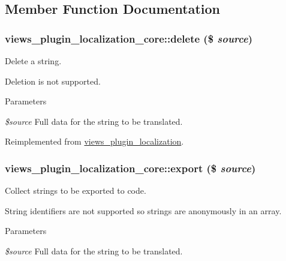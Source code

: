 \subsection{Member Function Documentation}
\hypertarget{classviews__plugin__localization__core_a9d1aef13f48d44133c19dcde49c9e123}{
\subsubsection[{delete}]{\setlength{\rightskip}{0pt plus 5cm}views\_\-plugin\_\-localization\_\-core::delete (\$ {\em source})}}
\label{classviews__plugin__localization__core_a9d1aef13f48d44133c19dcde49c9e123}
Delete a string.

Deletion is not supported.


\begin{DoxyParams}{Parameters}
\item[{\em \$source}]Full data for the string to be translated. \end{DoxyParams}


Reimplemented from \hyperlink{classviews__plugin__localization_a52726c9177d4dcf033ac81c8287bb5f6}{views\_\-plugin\_\-localization}.\hypertarget{classviews__plugin__localization__core_aab727cab888d512998e318be557813d7}{
\subsubsection[{export}]{\setlength{\rightskip}{0pt plus 5cm}views\_\-plugin\_\-localization\_\-core::export (\$ {\em source})}}
\label{classviews__plugin__localization__core_aab727cab888d512998e318be557813d7}
Collect strings to be exported to code.

String identifiers are not supported so strings are anonymously in an array.


\begin{DoxyParams}{Parameters}
\item[{\em \$source}]Full data for the string to be translated. \end{DoxyParams}


